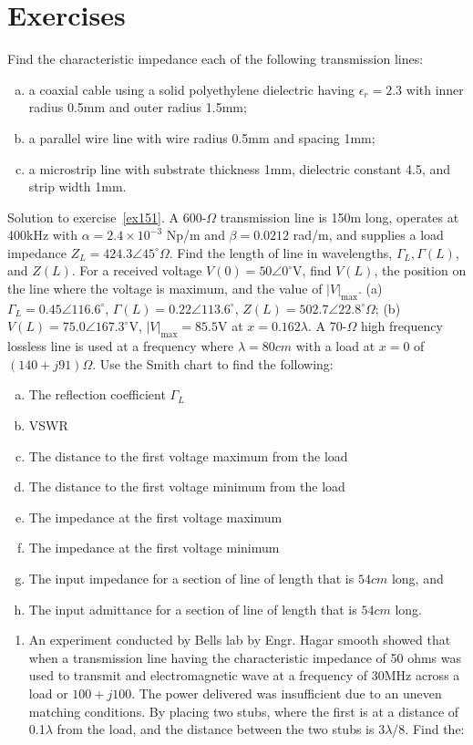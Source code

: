 \section{Exercises}
\begin{ExerciseList}
\Exercise[label={ex151}]
Find the characteristic impedance each of the following transmission lines:
\begin{enumerate}[(a)]
\item a coaxial cable using a solid polyethylene dielectric having $\epsilon_r = 2.3$ with inner radius 0.5mm and outer radius 1.5mm; 
\item a parallel wire line with wire radius 0.5mm and spacing 1mm; 
\item a microstrip line with substrate thickness 1mm, dielectric constant 4.5, and strip width 1mm.
\end{enumerate}
\Answer[ref={ex151}]
Solution to exercise~\ref{ex151}.
\Exercise[label={ex152}]
A 600-$\varOmega$ transmission line is 150m long, operates at 400kHz with $\alpha = 2.4\times 10^{-3}$ Np/m and $\beta = 0.0212$ rad/m, and supplies a load impedance $Z_L = 424.3\angle45^{\circ}\varOmega$. Find the length of line in wavelengths, $\Gamma_L, \Gamma(L)$, and $Z(L)$. For a received voltage $V(0) = 50\angle0^{\circ}$V, find $V(L)$, the position on the line where the voltage is maximum, and the value of $|V|_\max$.
\Answer[ref={ex152}]
(a) $\Gamma_L = 0.45\angle116.6^{\circ}$, $\Gamma(L) = 0.22\angle113.6^{\circ}$, $Z(L) = 502.7\angle22.8^{\circ}\varOmega$; (b) $V(L) = 75.0\angle167.3^{\circ}$V, $|V|_\max = 85.5$V at $x = 0.162\lambda$.
\Exercise[label={ex153}]
A 70-$\varOmega$ high frequency lossless line is used at a frequency where $\lambda = 80cm$ with a load at $x = 0$ of $(140 + j91)\varOmega$. Use the Smith chart to find the following:
\begin{enumerate}[(a)]
\item The reflection coefficient $\Gamma_L$ 
\item VSWR
\item The distance to the first voltage maximum from the load
\item The distance to the first voltage minimum from the load
\item The impedance at the first voltage maximum
\item The impedance at the first voltage minimum
\item The input impedance for a section of line of length that is $54cm$ long, and
\item The input admittance for a section of line of length that is $54cm$ long.
\end{enumerate}
\begin{enumerate}
\item An experiment conducted by Bells lab by Engr. Hagar smooth showed that when a transmission line having the characteristic impedance of 50 ohms was used to transmit and electromagnetic wave at a frequency of 30MHz across a load or  \(100+j100\). The power delivered was insufficient due to an uneven matching conditions. By placing two stubs, where the first is at a distance of 0.1{$\lambda$}  from the load, and the distance between the two stubs is 3{$\lambda$}/8. Find the:



\end{enumerate}
\end{ExerciseList}
